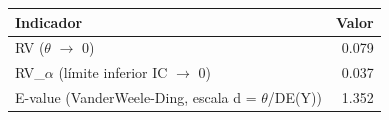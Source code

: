 \begin{tabular}{lr}
\toprule
Indicador & Valor \\
\midrule
RV ($\theta$ $\rightarrow$ 0) & 0.079 \\
RV\_$\alpha$ (límite inferior IC $\rightarrow$ 0) & 0.037 \\
E-value (VanderWeele-Ding, escala d = $\theta$/DE(Y)) & 1.352 \\
\bottomrule
\end{tabular}